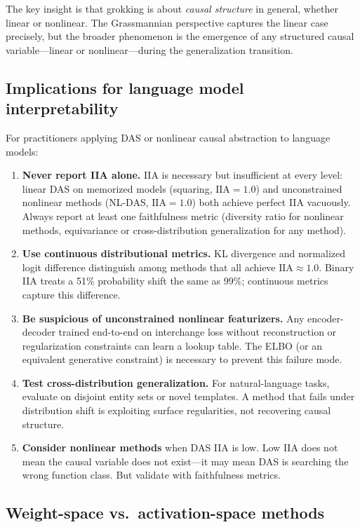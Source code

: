 \documentclass{article}
\newcommand{\IIA}{\mathrm{IIA}}
\begin{document}
The key insight is that grokking is about \emph{causal structure} in general,
whether linear or nonlinear. The Grassmannian perspective captures the linear
case precisely, but the broader phenomenon is the emergence of any structured
causal variable---linear or nonlinear---during the generalization transition.

\subsection{Implications for language model interpretability}

For practitioners applying DAS or nonlinear causal abstraction to language
models:
\begin{enumerate}
\item \textbf{Never report IIA alone.} IIA is necessary but insufficient at
  every level: linear DAS on memorized models (squaring, $\IIA = 1.0$) and
  unconstrained nonlinear methods (NL-DAS, $\IIA = 1.0$) both achieve
  perfect IIA vacuously. Always report at least one faithfulness metric
  (diversity ratio for nonlinear methods, equivariance or cross-distribution
  generalization for any method).
\item \textbf{Use continuous distributional metrics.} KL divergence and
  normalized logit difference distinguish among methods that all achieve
  $\IIA \approx 1.0$. Binary IIA treats a 51\% probability shift the same as
  99\%; continuous metrics capture this difference.
\item \textbf{Be suspicious of unconstrained nonlinear featurizers.} Any
  encoder-decoder trained end-to-end on interchange loss without reconstruction
  or regularization constraints can learn a lookup table. The ELBO
  (or an equivalent generative constraint) is necessary to prevent this
  failure mode.
\item \textbf{Test cross-distribution generalization.} For natural-language
  tasks, evaluate on disjoint entity sets or novel templates. A method that
  fails under distribution shift is exploiting surface regularities, not
  recovering causal structure.
\item \textbf{Consider nonlinear methods} when DAS IIA is low. Low IIA does not
  mean the causal variable does not exist---it may mean DAS is searching the
  wrong function class. But validate with faithfulness metrics.
\end{enumerate}

\subsection{Weight-space vs.\ activation-space methods}
\end{document}
